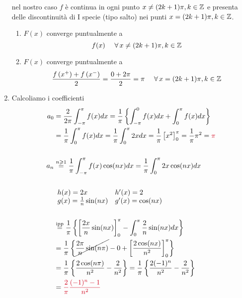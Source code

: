 \begin{enumerate}
nel nostro caso $f$ è continua in ogni punto $x\neq (2k + 1) \pi ,k\in \mathbb{Z} $ e presenta delle discontinuità di I specie (tipo salto) nei punti $x = (2k + 1) \pi ,k\in \mathbb{Z} $.
\begin{enumerate}
\item $F(x)$ converge puntualmente a\begin{equation*}
f(x) \ \ \ \ \forall x\neq (2k + 1) \pi ,k\in \ZZ 
\end{equation*}
\item $F(x)$ converge puntualmente a\begin{equation*}
\frac{f\left(x^{ + }\right) + f\left(x^{ - }\right)}{2} = \frac{0 + 2\pi }{2} = \pi \ \ \ \ \forall x = (2k + 1) \pi ,k\in \ZZ 
\end{equation*}
\end{enumerate}
\item Calcoliamo i coefficienti\begin{align*}
a_{0} & = \frac{2}{2\pi }\int ^{\pi }_{ - \pi } f(x) dx = \frac{1}{\pi }\left\{\int ^{0}_{ - \pi } f(x) dx + \int ^{\pi }_{0} f(x) dx\right\}\\
 & = \frac{1}{\pi }\int ^{\pi }_{0} f(x) dx = \frac{1}{\pi }\int ^{\pi }_{0} 2xdx = \frac{1}{\pi }\left[ x^{2}\right]^{\pi }_{0} = \frac{1}{\pi } \pi ^{2} = \textcolor[rgb]{0.82,0.01,0.11}{\pi }\\
 & \\
a_{n} & \overset{n\geqslant 1}{ = }\frac{1}{\pi }\int ^{\pi }_{ - \pi } f(x)\cos(nx) dx = \frac{1}{\pi }\int ^{\pi }_{0} 2x\cos(nx) dx\\
 & \\
 & \begin{array}{ l l }
h(x) = 2x & h'(x) = 2\\
g(x) = \frac{1}{n}\sin(nx) & g'(x) = \cos(nx)
\end{array}\\
 & \\
 & \overset{\text{ipp}}{ = }\frac{1}{\pi }\left\{\left[\frac{2x}{n}\sin(nx)\right]^{\pi }_{0} - \int ^{\pi }_{0}\frac{2}{n}\sin(nx) dx\right\}\\
 & = \frac{1}{\pi }\left\{\cancel{\frac{2\pi }{n}\sin(n\pi)} - 0 + \left[\frac{2\cos(nx)}{n^{2}}\right]^{\pi }_{0}\right\}\\
 & = \frac{1}{\pi }\left\{\frac{2\cos(n\pi)}{n^{2}} - \frac{2}{n^{2}}\right\} = \frac{1}{\pi }\left\{\frac{2(- 1)^{n}}{n^{2}} - \frac{2}{n^{2}}\right\}\\
 & = \textcolor[rgb]{0.82,0.01,0.11}{\frac{2}{\pi }}\textcolor[rgb]{0.82,0.01,0.11}{\frac{(- 1)^{n} - 1}{n^{2}}}\\

\end{align*}
\end{enumerate}
